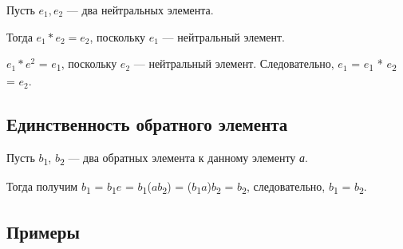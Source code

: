 \documentclass[12pt]{article}
\begin{document}
Пусть $e_{1}, e_{2}$ --- два нейтральных элемента.

Тогда $e_{1} * e_{2} = e_{2}$, поскольку $e_{1}$ --- нейтральный элемент.

$e_{1} * e^2$ = $e$\textsubscript{1}, поскольку
$e_{2}$ --- нейтральный элемент. Следовательно,
$e_{1}$ = $e$\textsubscript{1} * $e$\textsubscript{2} =
$e_{2}$.

\subsection{Единственность обратного
    элемента}

Пусть $b$\textsubscript{1}, $b$\textsubscript{2} --- два обратных элемента к
данному элементу \emph{а}.

Тогда получим $b$\textsubscript{1} = $b$\textsubscript{1}$e$ =
$b$\textsubscript{1}($a$$b$\textsubscript{2}) =
($b$\textsubscript{1}$a$)$b$\textsubscript{2} = $b$\textsubscript{2},
следовательно, $b$\textsubscript{1} = $b$\textsubscript{2}.

\subsection{Примеры}
\end{document}
